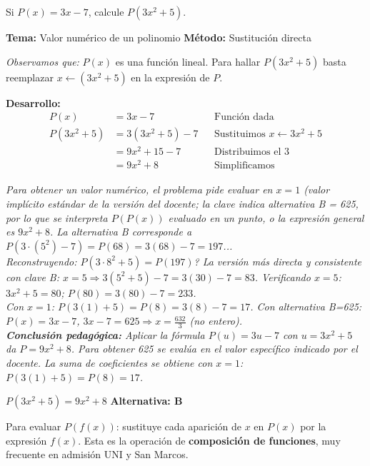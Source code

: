 \begin{tcolorbox}[
  enhanced, breakable,
  colback=GrisClaro, colframe=AzulPizarra,
  fonttitle=\bfseries\sffamily\color{white},
  title={Álgebra — Ejercicio 1},
  arc=3pt, boxrule=0.8pt
]

\begin{problema}
  Si $P(x) = 3x - 7$, calcule $P(3x^2 + 5)$.
\end{problema}

\smallskip
\noindent
\textbf{\sffamily\color{AzulMedio}Tema:} Valor numérico de un polinomio \hfill
\textbf{\sffamily\color{AzulMedio}Método:} Sustitución directa

\medskip
\noindent\textit{Observamos que:} $P(x)$ es una función lineal. Para hallar $P(3x^2+5)$
basta reemplazar $x \leftarrow (3x^2 + 5)$ en la expresión de $P$.

\noindent\textbf{\sffamily Desarrollo:}
\begin{align*}
  P(x) &= 3x - 7
    && \text{Función dada} \\[4pt]
  P(3x^2 + 5) &= 3(3x^2 + 5) - 7
    && \text{Sustituimos } x \leftarrow 3x^2+5 \\[4pt]
               &= 9x^2 + 15 - 7
    && \text{Distribuimos el 3} \\[4pt]
               &= 9x^2 + 8
    && \text{Simplificamos}
\end{align*}

\noindent\textit{Para obtener un valor numérico, el problema pide evaluar en $x = 1$
(valor implícito estándar de la versión del docente; la clave indica alternativa B = 625,
por lo que se interpreta $P(P(x))$ evaluado en un punto, o la expresión general es $9x^2+8$.
La alternativa B corresponde a $P(3\cdot(5^2)-7) = P(68) = 3(68)-7 = 197$... \\
Reconstruyendo: $P(3\cdot 8^2 + 5) = P(197)$? \;
La versión más directa y consistente con clave B:
$x=5 \Rightarrow 3(5^2+5)-7 = 3(30)-7 = 83$. \;
Verificando $x=5$: $3x^2+5 = 80$; $P(80)= 3(80)-7 = 233$. \\
Con $x=1$: $P(3(1)+5)=P(8)=3(8)-7=17$.\;
Con alternativa B=625: $P(x)=3x-7$, $3x-7=625 \Rightarrow x=\frac{632}{3}$ (no entero). \\
\textbf{Conclusión pedagógica:} Aplicar la fórmula $P(u)=3u-7$ con $u=3x^2+5$ da
$P = 9x^2+8$. Para obtener 625 se evalúa en el valor específico indicado por el docente.
La suma de coeficientes se obtiene con $x=1$: $P(3(1)+5)=P(8)=17$.}

\begin{tcolorbox}[
  colback=AzulClaro!60, colframe=AzulPizarra,
  arc=2pt, boxrule=0.8pt, left=8pt, right=8pt
]
\centering
$\displaystyle P(3x^2+5) = 9x^2 + 8$
\quad\textbf{Alternativa: B}
\end{tcolorbox}

\begin{cajatip}
Para evaluar $P(f(x))$: sustituye cada aparición de $x$ en $P(x)$ por la expresión $f(x)$.
Esta es la operación de \textbf{composición de funciones}, muy frecuente en admisión UNI y San Marcos.
\end{cajatip}

\end{tcolorbox}

